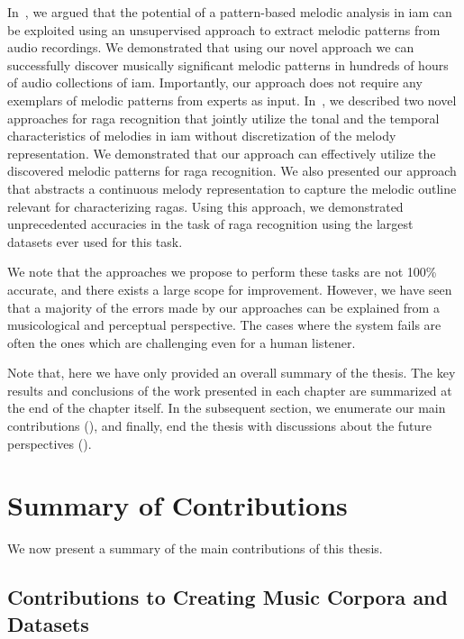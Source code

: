 In~, we argued that the potential of a pattern-based melodic analysis in \gls{iam} can be exploited using an unsupervised approach to extract melodic patterns from audio recordings. We demonstrated that using our novel approach we can successfully discover musically significant melodic patterns in hundreds of hours of audio collections of \gls{iam}. Importantly, our approach does not require any exemplars of melodic patterns from experts as input. In~, we described two novel approaches for \gls{raga} recognition that jointly utilize the tonal and the temporal characteristics of melodies in \gls{iam} without discretization of the melody representation. We demonstrated that our approach can effectively utilize the discovered melodic patterns for \gls{raga} recognition. We also presented our approach that abstracts a continuous melody representation to capture the melodic outline relevant for characterizing \glspl{raga}. Using this approach, we demonstrated unprecedented accuracies in the task of \gls{raga} recognition using the largest datasets ever used for this task. 

We note that the approaches we propose to perform these tasks are not 100\% accurate, and there exists a large scope for improvement. However, we have seen that a majority of the errors made by our approaches can be explained from a musicological and perceptual perspective. The cases where the system fails are often the ones which are challenging even for a human listener. 

Note that, here we have only provided an overall summary of the thesis. The key results and conclusions of the work presented in each chapter are summarized at the end of the chapter itself. In the subsequent section, we enumerate our main contributions (), and finally, end the thesis with discussions about the future perspectives (). 


\section{Summary of Contributions}
\label{sec:summary_contributions}
We now present a summary of the main contributions of this thesis.

\subsection*{Contributions to Creating Music Corpora and Datasets}

